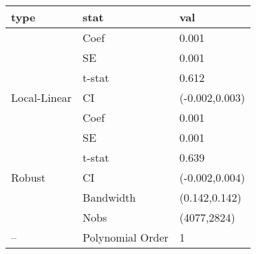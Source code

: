 
\begin{tabular}{lll}
\toprule
type & stat & val\\
\midrule
 & Coef & 0.001\\

 & SE & 0.001\\

 & t-stat & 0.612\\

\multirow{-4}{*}{\raggedright\arraybackslash Local-Linear} & CI & (-0.002,0.003)\\
\cmidrule{1-3}
 & Coef & 0.001\\

 & SE & 0.001\\

 & t-stat & 0.639\\

\multirow{-4}{*}{\raggedright\arraybackslash Robust} & CI & (-0.002,0.004)\\
\cmidrule{1-3}
 & Bandwidth & (0.142,0.142)\\

 & Nobs & (4077,2824)\\

\multirow{-3}{*}{\raggedright\arraybackslash --} & Polynomial Order & 1\\
\bottomrule
\end{tabular}